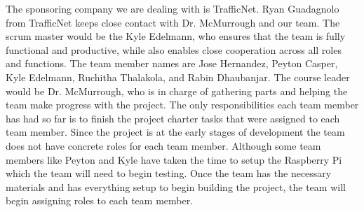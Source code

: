 The sponsoring company we are dealing with is TrafficNet. Ryan Guadagnolo from TrafficNet keeps close contact with Dr. McMurrough and our team. The scrum master would be the Kyle Edelmann, who ensures that the team is fully functional and productive, while also enables close cooperation across all roles and functions. The team member names are Jose Hernandez, Peyton Casper, Kyle Edelmann, Ruchitha Thalakola, and Rabin Dhaubanjar. The course leader would be Dr. McMurrough, who is in charge of gathering parts and helping the team make progress with the project.  The only responsibilities each team member has had so far is to finish the project charter tasks that were assigned to each team member. Since the project is at the early stages of development the team does not have concrete roles for each team member. Although some team members like Peyton and Kyle have taken the time to setup the Raspberry Pi which the team will need to begin testing. Once the team has the necessary materials and has everything setup to begin building the project, the team will begin assigning roles to each team member.
